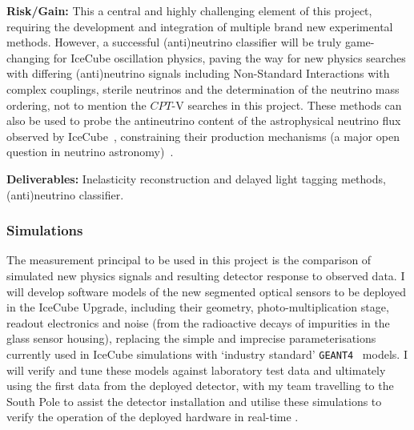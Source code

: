 \documentclass[a4paper,11pt]{article}
\begin{document}
\textbf{Risk/Gain:} This a central and highly challenging element of this project, requiring the development and integration of multiple brand new experimental methods. However, a successful (anti)neutrino classifier will be truly game-changing for IceCube oscillation physics, paving the way for new physics searches with differing (anti)neutrino signals including Non-Standard Interactions with complex couplings, sterile neutrinos and the determination of the neutrino mass ordering, not to mention the $CPT$-V searches in this project. These methods can also be used to probe the antineutrino content of the astrophysical neutrino flux observed by IceCube~\cite{Aartsen:2013jdh}, constraining their production mechanisms (a major open question in neutrino astronomy)~\cite{glashow_icecube}.

\textbf{Deliverables:} Inelasticity reconstruction and delayed light tagging methods, (anti)neutrino classifier. \\

\subsubsection{Simulations}



The measurement principal to be used in this project is the comparison of simulated new physics signals and resulting detector response to observed data. I will develop software models of the new segmented optical sensors to be deployed in the IceCube Upgrade, including their geometry, photo-multiplication stage, readout electronics and noise (from the radioactive decays of impurities in the glass sensor housing), replacing the simple and imprecise parameterisations currently used in IceCube simulations with `industry standard' \texttt{GEANT4}~\cite{Agostinelli:2002hh} models. I will verify and tune these models against laboratory test data and ultimately using the first data from the deployed detector, with my team travelling to the South Pole to assist the detector installation and utilise these simulations to verify the operation of the deployed hardware in real-time .
\end{document}
